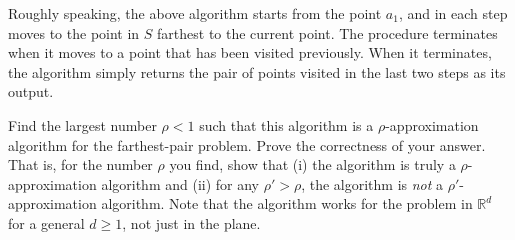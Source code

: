 \documentclass[letterpaper, 11pt]{article}
\newcommand{\1}{\mathds{1}}	%
\theoremstyle{definition}
\begin{document}
Roughly speaking, the above algorithm starts from the point $a_1$, and in each step moves to the point in $S$ farthest to the current point.
The procedure terminates when it moves to a point that has been visited previously.
When it terminates, the algorithm simply returns the pair of points visited in the last two steps as its output.

Find the largest number $\rho < 1$ such that this algorithm is a $\rho$-approximation algorithm for the farthest-pair problem.
Prove the correctness of your answer.
That is, for the number $\rho$ you find, show that (i) the algorithm is truly a $\rho$-approximation algorithm and (ii) for any $\rho' > \rho$, the algorithm is \textit{not} a $\rho'$-approximation algorithm.
Note that the algorithm works for the problem in $\mathbb{R}^d$ for a general $d \geq 1$, not just in the plane.
\end{document}
